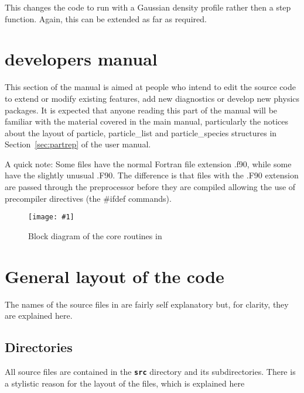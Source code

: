 \documentclass[12pt,a4paper]{article}
\newcommand{\inlinecode}[1]{{\color{warwickred} \bf\texttt{#1}}}
\newcommand{\sect}[1]{Section~\ref{sec:#1}}
\newcommand{\EPOCH}{{\color{warwickdark}\fontfamily{phv}\selectfont{EPOCH}}}
\newcommand{\scaledcapimage}[4]
  {{\begin{figure}[hbt!]\centering\texttt{[image: \#1]}\caption{#3}
    \label{#2} \end{figure}}}
\begin{document}
This changes the code to run with a Gaussian density profile rather then a step
function. Again, this can be extended as far as required.



%
{
  \selectfont
}
\selectfont%
\newpage%

\section{{\EPOCH} developers manual}

This section of the manual is aimed at people who intend to edit the {\EPOCH}
source code to extend or modify existing features, add new diagnostics or
develop new physics packages. It is expected that anyone reading this part of
the manual will be familiar with the material covered in the main manual,
particularly the notices about the layout of particle, particle\_list and
particle\_species structures in \sect{partrep} of the user manual.

A quick note: Some files have the normal Fortran file extension .f90, while
some have the slightly unusual .F90. The difference is that files with the
.F90 extension are passed through the preprocessor before they are compiled
allowing the use of precompiler directives (the \#ifdef commands).

\scaledcapimage{./images/coreblock}{coreblock}{Block diagram of the core
  routines in {\EPOCH}}{0.5}

\section{General layout of the {\EPOCH} code}

The names of the source files in {\EPOCH} are fairly self explanatory but, for
clarity, they are explained here.

\subsection{Directories}
All source files are contained in the \inlinecode{src} directory and its
subdirectories. There is a stylistic reason for the layout of the files, which
is explained here
\end{document}
